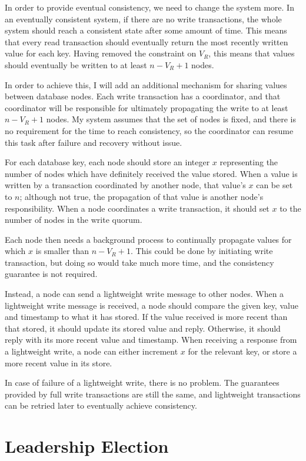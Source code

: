 \documentclass[12pt,a4paper,twoside,openright]{report}
\begin{document}
In order to provide eventual consistency, we need to change the system more. In an eventually consistent system, if there are no write transactions, the whole system should reach a consistent state after some amount of time. This means that every read transaction should eventually return the most recently written value for each key. Having removed the constraint on $V_R$, this means that values should eventually be written to at least $n - V_R + 1$ nodes.

In order to achieve this, I will add an additional mechanism for sharing values between database nodes. Each write transaction has a coordinator, and that coordinator will be responsible for ultimately propagating the write to at least $n - V_R + 1$ nodes. My system assumes that the set of nodes is fixed, and there is no requirement for the time to reach consistency, so the coordinator can resume this task after failure and recovery without issue.

For each database key, each node should store an integer $x$ representing the number of nodes which have definitely received the value stored.  When a value is written by a transaction coordinated by another node, that value's $x$ can be set to $n$; although not true, the propagation of that value is another node's responsibility. When a node coordinates a write transaction, it should set $x$ to the number of nodes in the write quorum.

Each node then needs a background process to continually propagate values for which $x$ is smaller than $n - V_R + 1$. This could be done by initiating write transaction, but doing so would take much more time, and the consistency guarantee is not required.

Instead, a node can send a lightweight write message to other nodes. When a lightweight write message is received, a node should compare the given key, value and timestamp to what it has stored. If the value received is more recent than that stored, it should update its stored value and reply. Otherwise, it should reply with its more recent value and timestamp. When receiving a response from a lightweight write, a node can either increment $x$ for the relevant key, or store a more recent value in its store.

In case of failure of a lightweight write, there is no problem. The guarantees provided by full write transactions are still the same, and lightweight transactions can be retried later to eventually achieve consistency.

\section{Leadership Election}
\end{document}
